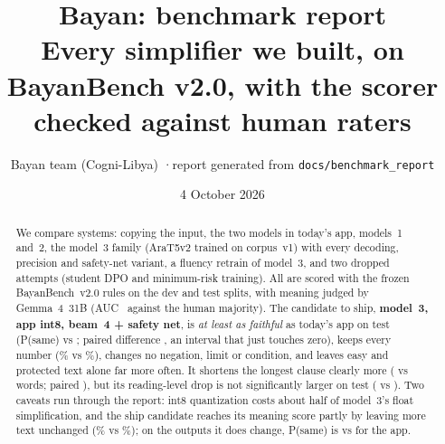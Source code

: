 \documentclass[10pt,a4paper]{article}
\title{\textbf{Bayan: benchmark report}\\[2pt]\large Every simplifier we built, on BayanBench v2.0, with the scorer checked against human raters}
\author{Bayan team (Cogni-Libya) \quad·\quad report generated from \texttt{docs/benchmark\_report}}
\date{4 October 2026}
\newcommand{\ship}{\textbf{model~3, app int8, beam~4 + safety net}}
\begin{document}
\maketitle
\begin{abstract}\noindent
We compare \NSystems{} systems: copying the input, the two models in today's app, models~1 and~2, the model~3 family
(AraT5v2 trained on corpus~v1) with every decoding, precision and safety-net variant, a fluency retrain of model~3, and
two dropped attempts (student DPO and minimum-risk training). All are scored with the frozen BayanBench~v2.0 rules on
the dev and test splits, with meaning judged by Gemma~4~31B (AUC~\JudgeAUC{} against the human majority). The
candidate to ship, \ship, is \emph{at least as faithful} as today's app on test (P(same) \TestShipPsame{} vs
\TestAppPsame; paired difference \TestDiffPsame, an interval that just touches zero), keeps every number
(\TestShipNum\% vs \TestAppNum\%), changes no negation, limit or condition, and leaves easy and protected text alone far
more often. It shortens the longest clause clearly more (\TestShipClause{} vs \TestAppClause{} words; paired
\TestDiffClause), but its reading-level drop is not significantly larger on test (\TestShipLevel{} vs
\TestAppLevel{}). Two caveats run through the report: int8 quantization costs about half of model~3's float
simplification, and the ship candidate reaches its meaning score partly by leaving more text unchanged
(\TestShipUnch\% vs \TestAppUnch\%); on the outputs it does change, P(same) is \TestShipPsameChanged{} vs
\TestAppPsameChanged{} for the app.
\end{abstract}
\tableofcontents
\newpage

\end{document}
